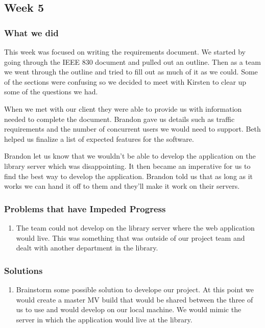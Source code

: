 \documentclass[letterpaper,10pt,titlepage, onecolumn, compsoc]{IEEEtran}
\begin{document}
\subsection{Week 5}

\subsubsection{What we did}
This week was focused on writing the requirements document. We started by going through the IEEE 830 document and pulled out an outline. Then as a team we went through the outline and tried to fill out as much of it as we could. Some of the sections were confusing so we decided to meet with Kirsten to clear up some of the questions we had. 

When we met with our client they were able to provide us with information needed to complete the document. Brandon gave us details such as traffic requirements and the number of concurrent users we would need to support. Beth helped us finalize a list of expected features for the software. 

Brandon let us know that we wouldn’t be able to develop the application on the library server which was disappointing. It then became an imperative for us to find the best way to develop the application. Brandon told us that as long as it works we can hand it off to them and they’ll make it work on their servers. 

\subsubsection{Problems that have Impeded Progress}
\begin{enumerate}
	\item The team could not develop on the library server where the web application would live. This was something that was outside of our project team and dealt with another department in the library. 
\end{enumerate}

\subsubsection{Solutions}
\begin{enumerate}
	\item Brainstorm some possible solution to develope our project. At this point we would create a master MV build that would be shared between the three of us to use and would develop on our local machine. We would mimic the server in which the application would live at the library. 
\end{enumerate}
\end{document}
